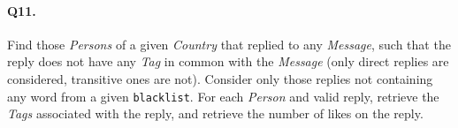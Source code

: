 \paragraph{Q11.}
Find those \emph{Persons} of a given \emph{Country} that replied to any
\emph{Message}, such that the reply does not have any \emph{Tag} in
common with the \emph{Message} (only direct replies are considered,
transitive ones are not). Consider only those replies not containing any
word from a given \texttt{blacklist}. For each \emph{Person} and valid
reply, retrieve the \emph{Tags} associated with the reply, and retrieve
the number of likes on the reply.
